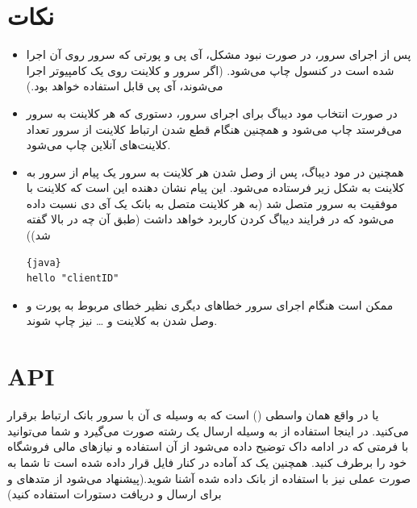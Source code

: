 \documentclass[]{article}
\begin{document}
\newpage

\section*{{\titr نکات}}

\begin{itemize}
\item
پس از اجرای سرور، در صورت نبود مشکل، آی پی و پورتی که سرور روی آن اجرا شده است در کنسول چاپ می‌شود. (اگر سرور و کلاینت روی یک کامپیوتر اجرا می‌شوند، آی پی  قابل استفاده خواهد بود.)

\item
در صورت انتخاب مود دیباگ برای اجرای سرور، دستوری که هر کلاینت به سرور می‌فرستد چاپ می‌شود و همچنین هنگام قطع شدن ارتباط کلاینت از سرور تعداد کلاینت‌های آنلاین چاپ می‌شود.

\item
همچنین در مود دیباگ، پس از وصل شدن هر کلاینت به سرور یک پیام از سرور به کلاینت به شکل زیر فرستاده می‌شود. این پیام نشان دهنده این است که کلاینت با موفقیت به سرور متصل شد (به هر کلاینت متصل به بانک یک آی دی نسبت داده می‌شود که در فرایند دیباگ کردن کاربرد خواهد داشت (طبق آن چه در بالا گفته شد)‌)


\begin{latin}

\begin{lstlisting}{java}
hello "clientID"
\end{lstlisting}

\end{latin}



\item
ممکن است هنگام اجرای سرور خطاهای دیگری نظیر خطای مربوط به پورت و وصل شدن به کلاینت و … نیز چاپ شوند.

\end{itemize}

\section*{{\titr API}}

 یا  در واقع همان واسطی () است که به وسیله ی آن با سرور بانک ارتباط برقرار می‌کنید. در اینجا استفاده از  به وسیله ارسال یک رشته صورت می‌گیرد و شما می‌توانید با فرمتی که در ادامه داک توضیح داده می‌شود از آن استفاده و نیاز‌های مالی فروشگاه خود را برطرف کنید. همچنین یک کد آماده در کنار فایل  قرار داده شده است تا شما به صورت عملی نیز با استفاده از  بانک داده شده آشنا شوید.(‌پیشنهاد می‌شود از متدهای \href{https://docs.oracle.com/javase/7/docs/api/java/io/DataOutputStream.html#writeUTF(java.lang.String)}{\textcolor{blue}{\underline{}}}
 و
  \href{https://docs.oracle.com/javase/7/docs/api/java/io/DataInputStream.html#readUTF()}{\textcolor{blue}{\underline{}}}
   برای ارسال و دریافت دستورات استفاده کنید)
\end{document}
